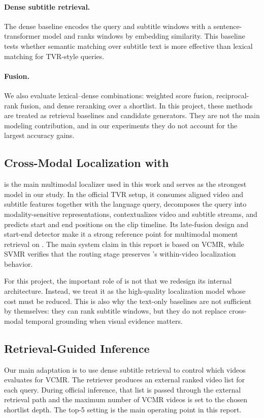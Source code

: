 \paragraph{Dense subtitle retrieval.}
The dense baseline encodes the query and subtitle windows with a sentence-transformer model and ranks windows by embedding similarity. This baseline tests whether semantic matching over subtitle text is more effective than lexical matching for TVR-style queries.

\paragraph{Fusion.}
We also evaluate lexical--dense combinations: weighted score fusion, reciprocal-rank fusion, and dense reranking over a \bm shortlist. In this project, these methods are treated as retrieval baselines and candidate generators. They are not the main modeling contribution, and in our experiments they do not account for the largest accuracy gains.

\subsection{Cross-Modal Localization with \xml}
\xml is the main multimodal localizer used in this work and serves as the strongest model in our study. In the official TVR setup, it consumes aligned video and subtitle features together with the language query, decomposes the query into modality-sensitive representations, contextualizes video and subtitle streams, and predicts start and end positions on the clip timeline. Its late-fusion design and start-end detector make it a strong reference point for multimodal moment retrieval on \dataset \cite{lei2020tvr}. The main system claim in this report is based on VCMR, while SVMR verifies that the routing stage preserves \xml's within-video localization behavior.

For this project, the important role of \xml is not that we redesign its internal architecture. Instead, we treat it as the high-quality localization model whose cost must be reduced. This is also why the text-only baselines are not sufficient by themselves: they can rank subtitle windows, but they do not replace cross-modal temporal grounding when visual evidence matters.

\subsection{Retrieval-Guided \xml Inference}
Our main adaptation is to use dense subtitle retrieval to control which videos \xml evaluates for VCMR. The retriever produces an external ranked video list for each query. During official \xml inference, that list is passed through the external retrieval path and the maximum number of VCMR videos is set to the chosen shortlist depth. The top-5 setting is the main operating point in this report.

